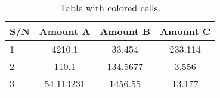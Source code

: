 \documentclass{article}
\begin{document}
	\begin{table}[h!]
		\begin{center}
			\caption{Table with colored cells.}
			\label{tab:table1}
			\begin{tabular}{|l|c|c|c}
				\hline\textbf{S/N} & \textbf{Amount A} & \textbf{Amount B} & \textbf{Amount C}\\
				\hline
				\cellcolor{blue!25}1 & 4210.1 & 33.454 & 233.114\\
				\cellcolor{green!20}2 & 110.1 & 134.5677 & 3.556\\
				\cellcolor{red!35}3 & 54.113231 & 1456.55 & 13.177\\
				\hline
			\end{tabular}
		\end{center}
	\end{table}
\end{document}
